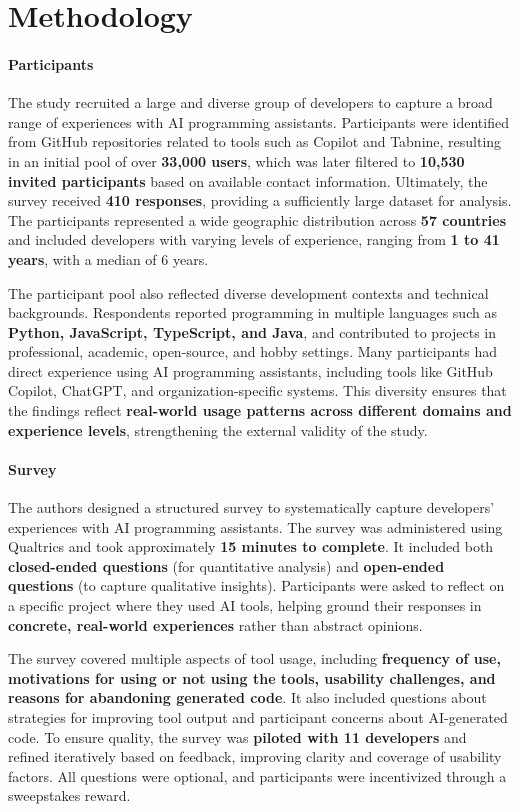 \section{Methodology}
\paragraph{Participants}
The study recruited a large and diverse group of developers to capture a broad range of experiences with AI programming assistants. Participants were identified from GitHub repositories related to tools such as Copilot and Tabnine, resulting in an initial pool of over \textbf{33,000 users}, which was later filtered to \textbf{10,530 invited participants} based on available contact information. Ultimately, the survey received \textbf{410 responses}, providing a sufficiently large dataset for analysis. The participants represented a wide geographic distribution across \textbf{57 countries} and included developers with varying levels of experience, ranging from \textbf{1 to 41 years}, with a median of 6 years.

The participant pool also reflected diverse development contexts and technical backgrounds. Respondents reported programming in multiple languages such as \textbf{Python, JavaScript, TypeScript, and Java}, and contributed to projects in professional, academic, open-source, and hobby settings. Many participants had direct experience using AI programming assistants, including tools like GitHub Copilot, ChatGPT, and organization-specific systems. This diversity ensures that the findings reflect \textbf{real-world usage patterns across different domains and experience levels}, strengthening the external validity of the study.

\paragraph{Survey}
The authors designed a structured survey to systematically capture developers’ experiences with AI programming assistants. The survey was administered using Qualtrics and took approximately \textbf{15 minutes to complete}. It included both \textbf{closed-ended questions} (for quantitative analysis) and \textbf{open-ended questions} (to capture qualitative insights). Participants were asked to reflect on a specific project where they used AI tools, helping ground their responses in \textbf{concrete, real-world experiences} rather than abstract opinions.

The survey covered multiple aspects of tool usage, including \textbf{frequency of use, motivations for using or not using the tools, usability challenges, and reasons for abandoning generated code}. It also included questions about strategies for improving tool output and participant concerns about AI-generated code. To ensure quality, the survey was \textbf{piloted with 11 developers} and refined iteratively based on feedback, improving clarity and coverage of usability factors. All questions were optional, and participants were incentivized through a sweepstakes reward.

